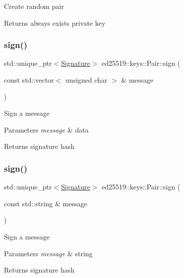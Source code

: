 Create random pair \begin{DoxyReturn}{Returns}
always exists private key 
\end{DoxyReturn}
\mbox{\label{classed25519_1_1keys_1_1_pair_ad92702362f23ad3d55e2d226e056c742}} 
\subsubsection{\texorpdfstring{sign()}{sign()}\hspace{0.1cm}{\footnotesize\ttfamily [1/3]}}
{\footnotesize\ttfamily std\+::unique\+\_\+ptr$<$\mbox{\hyperlink{classed25519_1_1_signature}{Signature}}$>$ ed25519\+::keys\+::\+Pair\+::sign (\begin{DoxyParamCaption}\item[{const std\+::vector$<$ unsigned char $>$ \&}]{message }\end{DoxyParamCaption})}

Sign a message 
\begin{DoxyParams}{Parameters}
{\em message} & data \\
\hline
\end{DoxyParams}
\begin{DoxyReturn}{Returns}
signature hash 
\end{DoxyReturn}
\mbox{\label{classed25519_1_1keys_1_1_pair_a1c53cc9aff7f89d8cefc27eb99d42f8d}} 
\subsubsection{\texorpdfstring{sign()}{sign()}\hspace{0.1cm}{\footnotesize\ttfamily [2/3]}}
{\footnotesize\ttfamily std\+::unique\+\_\+ptr$<$\mbox{\hyperlink{classed25519_1_1_signature}{Signature}}$>$ ed25519\+::keys\+::\+Pair\+::sign (\begin{DoxyParamCaption}\item[{const std\+::string \&}]{message }\end{DoxyParamCaption})}

Sign a message 
\begin{DoxyParams}{Parameters}
{\em message} & string \\
\hline
\end{DoxyParams}
\begin{DoxyReturn}{Returns}
signature hash 
\end{DoxyReturn}
\mbox{\label{classed25519_1_1keys_1_1_pair_ac1c7387192283f87fc16acf53eb9c313}} 
